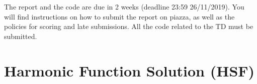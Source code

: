 \documentclass[a4paper, 11pt]{article}
\begin{document}

\maketitle

\vspace*{1.5cm}

The report and the code are due in 2 weeks (deadline 23:59 26/11/2019). You will find instructions on how to submit the report on piazza, as well as the policies for scoring and late submissions. All the code related to the TD must be submitted.

\section{Harmonic Function Solution (HSF)}
\end{document}
